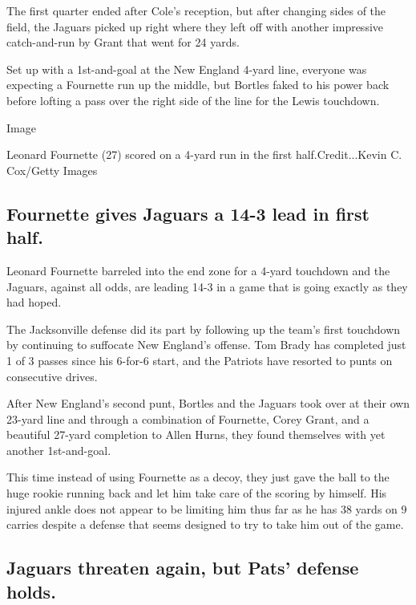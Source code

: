 The first quarter ended after Cole's reception, but after changing sides
of the field, the Jaguars picked up right where they left off with
another impressive catch-and-run by Grant that went for 24 yards.

Set up with a 1st-and-goal at the New England 4-yard line, everyone was
expecting a Fournette run up the middle, but Bortles faked to his power
back before lofting a pass over the right side of the line for the Lewis
touchdown.

Image

Leonard Fournette (27) scored on a 4-yard run in the first
half.Credit...Kevin C. Cox/Getty Images

\hypertarget{fournette-gives-jaguars-a-14-3-lead-in-first-half}{%
\subsection{Fournette gives Jaguars a 14-3 lead in first
half.}\label{fournette-gives-jaguars-a-14-3-lead-in-first-half}}

Leonard Fournette barreled into the end zone for a 4-yard touchdown and
the Jaguars, against all odds, are leading 14-3 in a game that is going
exactly as they had hoped.

The Jacksonville defense did its part by following up the team's first
touchdown by continuing to suffocate New England's offense. Tom Brady
has completed just 1 of 3 passes since his 6-for-6 start, and the
Patriots have resorted to punts on consecutive drives.

After New England's second punt, Bortles and the Jaguars took over at
their own 23-yard line and through a combination of Fournette, Corey
Grant, and a beautiful 27-yard completion to Allen Hurns, they found
themselves with yet another 1st-and-goal.

This time instead of using Fournette as a decoy, they just gave the ball
to the huge rookie running back and let him take care of the scoring by
himself. His injured ankle does not appear to be limiting him thus far
as he has 38 yards on 9 carries despite a defense that seems designed to
try to take him out of the game.

\hypertarget{jaguars-threaten-again-but-pats-defense-holds}{%
\subsection{Jaguars threaten again, but Pats' defense
holds.}\label{jaguars-threaten-again-but-pats-defense-holds}}

